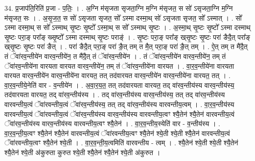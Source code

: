 \documentclass[17pt]{extarticle}
\begin{document}
34. प्र॒जाप॑ति॒रिति॑ प्र॒जा - प॒तिः॒ । . अ॒ग्नि म॑सृजता सृजता॒ग्नि म॒ग्नि म॑सृजत॒ स सो॑ ऽसृजता॒ग्नि म॒ग्नि म॑सृजत॒ सः । . अ॒सृ॒ज॒त॒ स सो॑ ऽसृजता सृजत॒ सो᳚ ऽस्मा दस्मा॒थ् सो॑ ऽसृजता सृजत॒ सो᳚ ऽस्मात् । . सो᳚ ऽस्मा दस्मा॒थ् स सो᳚ ऽस्माथ् सृ॒ष्टः सृ॒ष्टो᳚ ऽस्मा॒थ् स सो᳚ ऽस्माथ् सृ॒ष्टः । . अ॒स्मा॒थ् सृ॒ष्टः सृ॒ष्टो᳚ ऽस्मा दस्माथ् सृ॒ष्टः परा॒ङ् परा᳚ङ् ख्सृ॒ष्टो᳚ ऽस्मा दस्माथ् सृ॒ष्टः पराङ्॑ । . सृ॒ष्टः परा॒ङ् परा᳚ङ् ख्‌सृ॒ष्टः सृ॒ष्टः परा॑ ङैदै॒त् परा᳚ङ् ख्‌सृ॒ष्टः सृ॒ष्टः 
परा॑ ङैत् । . परा॑ ङैदै॒त् परा॒ङ् परा॑ ङै॒त् तम् त मै॒त् परा॒ङ् परा॑ ङै॒त् तम् । . ऐ॒त् तम् त मै॑दै॒त् तं ॅवा॑रव॒न्तीये॑न वारव॒न्तीये॑न॒ त मै॑दै॒त् तं ॅवा॑रव॒न्तीये॑न । . तं ॅवा॑रव॒न्तीये॑न वारव॒न्तीये॑न॒ तम् तं ॅवा॑रव॒न्तीये॑ना वारयता वारयत वारव॒न्तीये॑न॒ तम् तं ॅवा॑रव॒न्तीये॑ना वारयत । . वा॒र॒व॒न्तीये॑ना वारयता वारयत वारव॒न्तीये॑न वारव॒न्तीये॑ना वारयत॒ तत् तद॑वारयत वारव॒न्तीये॑न वारव॒न्तीये॑ना वारयत॒ तत् । . वा॒र॒व॒न्तीये॒नेति॑ वार - व॒न्तीये॑न । . अ॒वा॒र॒य॒त॒ तत् तद॑वारयता वारयत॒ तद् वा॑रव॒न्तीय॑स्य वारव॒न्तीय॑स्य॒ तद॑वारयता वारयत॒ तद् वा॑रव॒न्तीय॑स्य । . तद् वा॑रव॒न्तीय॑स्य वारव॒न्तीय॑स्य॒ तत् तद् वा॑रव॒न्तीय॑स्य वारवन्तीय॒त्वं ॅवा॑रवन्तीय॒त्वं ॅवा॑रव॒न्तीय॑स्य॒ तत् तद् वा॑रव॒न्तीय॑स्य वारवन्तीय॒त्वम् । . वा॒र॒व॒न्तीय॑स्य वारवन्तीय॒त्वं ॅवा॑रवन्तीय॒त्वं ॅवा॑रव॒न्तीय॑स्य वारव॒न्तीय॑स्य वारवन्तीय॒त्वꣳ श्यै॒तेन॑ श्यै॒तेन॑ वारवन्तीय॒त्वं ॅवा॑रव॒न्तीय॑स्य वारव॒न्तीय॑स्य वारवन्तीय॒त्वꣳ श्यै॒तेन॑ । . वा॒र॒व॒न्तीय॒स्येति॑ वार - व॒न्तीय॑स्य । . वा॒र॒व॒न्ती॒य॒त्वꣳ श्यै॒तेन॑ श्यै॒तेन॑ वारवन्तीय॒त्वं ॅवा॑रवन्तीय॒त्वꣳ श्यै॒तेन॑ श्ये॒ती श्ये॒ती श्यै॒तेन॑ वारवन्तीय॒त्वं ॅवा॑रवन्तीय॒त्वꣳ श्यै॒तेन॑ श्ये॒ती । . वा॒र॒व॒न्ती॒य॒त्वमिति॑ वारवन्तीय - त्वम् । . श्यै॒तेन॑ श्ये॒ती श्ये॒ती श्यै॒तेन॑ श्यै॒तेन॑ श्ये॒ती अ॑कुरुता कुरुत श्ये॒ती श्यै॒तेन॑ श्यै॒तेन॑ श्ये॒ती अ॑कुरुत । \newline
\end{document}
